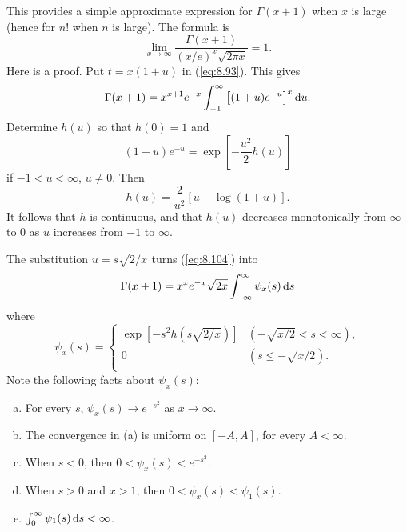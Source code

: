 \begin{thm}
    \label{thm:8.22}
    This provides a simple approximate expression for
    $\Gamma(x + 1)$ when $x$ is large (hence for $n!$ when $n$ is large).
    The formula is
    \begin{equation}
        \label{eq:8.103}
        \lim_{x \to \infty} \frac{\Gamma(x+1)}{(x/e)^{x}\sqrt{2\pi x}} = 1 .
    \end{equation}
    Here is a proof.
    Put $t=x(1+u)$ in (\ref{eq:8.93}).
    This gives
    \begin{equation}
        \label{eq:8.104}
        \Gamma(x+1) = x^{x+1} e^{-x}
        \int_{-1}^{\infty}
        \left[ (1+u)e^{-u} \right]^{x} \d u .
    \end{equation}
    Determine $h(u)$ so that $h(0)=1$ and
    \begin{equation}
        \label{eq:8.105}
        (1+u)e^{-u}=\exp \left[ -\frac{u^2}{2}h(u) \right]
    \end{equation}
    if $-1<u<\infty$, $u \neq 0$.
    Then
    \begin{equation}
        \label{eq:8.106}
        h(u) = \frac{2}{u^2} \left[ u - \log (1+u) \right].
    \end{equation}
    It follows that $h$ is continuous,
    and that $h(u)$ decreases monotonically from $\infty$
    to $0$ as $u$ increases from $-1$ to $\infty$.

    The substitution $u=s\sqrt{2/x}$ turns (\ref{eq:8.104}) into
    \begin{equation}
        \label{eq:8.107}
        \Gamma(x+1) = x^x e^{-x} \sqrt{2x}
        \int_{-\infty}^{\infty} \psi_x(s) \d s
    \end{equation}
    where
    \begin{equation*}
        \psi_x(s) = \left\{
        \begin{array}{ll}
            \exp \left[ -s^2 h (s\sqrt{2/x}) \right] & (-\sqrt{x/2}<s<\infty), \\
            0                                        & (s\leq -\sqrt{x/2}).    \\
        \end{array}
        \right.
    \end{equation*}
    Note the following facts about $\psi_x(s)$:
    \begin{enumerate}[(a)]
        \item For every $s$, $\psi_x(s)\rightarrow e^{-s^2}$ as $x \rightarrow \infty$.
        \item The convergence in (a) is uniform on $[-A,A]$, for every $A<\infty$.
        \item When $s<0$, then $0<\psi_x(s)<e^{-s^2}$.
        \item When $s>0$ and $x>1$, then $0<\psi_x(s)<\psi_1(s)$.
        \item $\int_{0}^{\infty}\psi_1(s)\d s<\infty$.
    \end{enumerate}
\end{thm}

